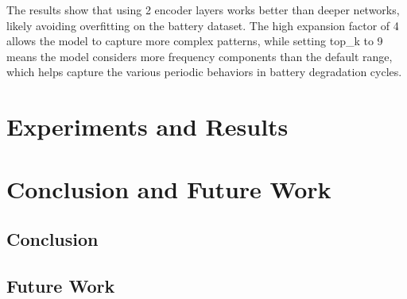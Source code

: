 The results show that using 2 encoder layers works better than deeper networks, likely avoiding overfitting on the battery dataset. The high expansion factor of 4 allows the model to capture more complex patterns, while setting top\_k to 9 means the model considers more frequency components than the default range, which helps capture the various periodic behaviors in battery degradation cycles.

\section{Experiments and Results}
\label{sec:experiments_results}

\lipsum[2-4]

\section{Conclusion and Future Work}
\label{sec:conclusion_future_work}
\lipsum[1]
\subsection{Conclusion}
\lipsum[5-6]
\subsection{Future Work}
\lipsum[7-8]



